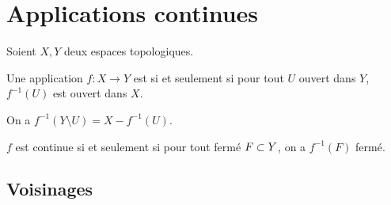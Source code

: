 \documentclass[french,a4paper,10pt]{article}
\begin{document}
	\section{Applications continues}
		\begin{definition}
			Soient $X, Y$ deux espaces topologiques.
			
			Une application $f\colon X\to Y$ est  si et seulement si pour tout $U$ ouvert dans $Y$, $f^{-1}(U)$ est ouvert dans $X$.
		\end{definition}
		\begin{remark}
			On a $f^{-1}(Y\setminus U)=X-f^{-1}(U)$.
			
			$f$ est continue si et seulement si pour tout fermé $F\subset Y$, on a $f^{-1}(F)$ fermé.
		\end{remark}
	\subsection{Voisinages}
	
\end{document}
